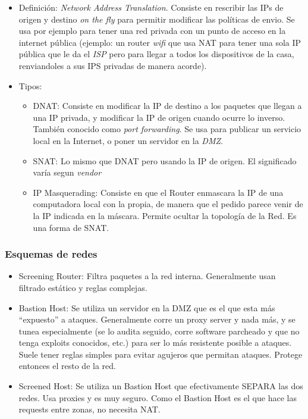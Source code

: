 \begin{itemize}
	\item Definición: \textit{Network Address Translation}. Consiste en rescribir las IPs de origen y destino \textit{on the fly} para permitir
	modificar las políticas de envio. Se usa por ejemplo para tener una red privada con un punto de acceso en la internet pública (ejemplo: un router
	\textit{wifi} que usa NAT para tener una sola IP pública que le da el \textit{ISP} pero para llegar a todos los dispositivos de la casa, renviandoles
	a sus IPS privadas de manera acorde).
	\item Tipos: \begin{itemize}
		\item DNAT: Consiste en modificar la IP de destino a los paquetes que llegan a una IP privada, y modificar la IP de origen cuando ocurre lo inverso.
		También conocido como \textit{port forwarding}. Se usa para publicar un servicio local en la Internet, o poner un servidor en la \textit{DMZ}.
		\item SNAT: Lo mismo que DNAT pero usando la IP de origen. El significado varía segun \textit{vendor}
		\item IP Masquerading: Consiste en que el Router enmascara la IP de una computadora local con la propia, de manera que el pedido parece venir
		de la IP indicada en la máscara. Permite ocultar la topología de la Red. Es una forma de SNAT.
	\end{itemize}
\end{itemize}

\subsubsection{Esquemas de redes}

\begin{itemize}
	\item Screening Router: Filtra paquetes a la red interna. Generalmente usan filtrado estático y reglas complejas.
	\item Bastion Host: Se utiliza un servidor en la DMZ que es el que esta más ``expuesto'' a ataques. Generalmente corre un proxy server
	y nada más, y se tunea especialmente (se lo audita seguido, corre software parcheado y que no tenga exploits conocidos, etc.) para ser lo más resistente 
	posible a ataques. Suele tener reglas simples para evitar agujeros que permitan ataques. Protege entonces el resto de la red.
	\item Screened Host: Se utiliza un Bastion Host que efectivamente SEPARA las dos redes. Usa proxies y es muy seguro. Como el Bastion Host es el que hace
	las requests entre zonas, no necesita NAT.
\end{itemize}

